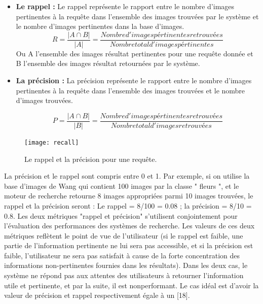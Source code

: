 \begin{itemize}
	\item \textbf{Le rappel :}
	Le rappel représente le rapport entre le nombre d’images pertinentes à la
	requête dans l’ensemble des images trouvées par le système et le nombre
	d’images pertinentes dans la base d’images.
	\begin{equation}
		R = \frac{| A \cap B|}{| A |} = \frac{Nombre d'images pértinentes retrouvées}{Nombre total d'images pértinentes}
	\end{equation}
	Ou A l’ensemble des images résultat pertinentes pour une requête donnée et
	B l’ensemble des images résultat retournées par le système.
	
	\item \textbf{La précision :}
	La précision représente le rapport entre le nombre d’images pertinentes à la
	requête dans l’ensemble des images trouvées et le nombre d’images trouvées.
	
	\begin{equation}
	P = \frac{| A \cap B|}{| B |} = \frac{Nombre d'images pértinentes retrouvées}{Nombre total d'images retrouvées}
	\end{equation}
	
\end{itemize}

\begin{figure}[H]
	\centering
	\texttt{[image: recall]} 
	\caption{ Le rappel et la précision pour une requête.}
\end{figure}

La précision et le rappel sont compris entre 0 et 1. Par exemple, si on utilise
la base d’images de Wang qui contient 100 images par la classe " fleurs ", et
le moteur de recherche retourne 8 images appropriées parmi 10 images
trouvées, le rappel et la précision seront :
Le rappel = 8/100 = 0.08 ; la précision = 8/10 = 0.8.
Les deux métriques "rappel et précision" s’utilisent conjointement pour
l’évaluation des performances des systèmes de recherche. Les valeurs de ces
deux métriques reflètent le point de vue de l’utilisateur (si le rappel est faible,
une partie de l’information pertinente ne lui sera pas accessible, et si la
précision est faible, l’utilisateur ne sera pas satisfait à cause de la forte
concentration des informations non-pertinentes fournies dans les résultats).
Dans les deux cas, le système ne répond pas aux attentes des utilisateurs à
retourner l’information utile et pertinente, et par la suite, il est nonperformant. Le cas idéal est d’avoir la valeur de précision et rappel
respectivement égale à un [18].

